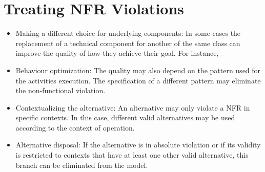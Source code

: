 \section{Treating NFR Violations}

\begin{itemize}

\item Making a different choice for underlying components: In some cases the replacement of a technical component for another of the same class can improve the quality of how they achieve their goal. For instance,
\medskip

\item Behaviour optimization: The quality may also depend on the pattern used for the activities execution. The specification of a different pattern may eliminate the non-functional violation. 
\medskip

\item Contextualizing the alternative: An alternative may only violate a NFR in specific contexts. In this case, different valid alternatives may be used according to the context of operation.
\medskip

\item Alternative disposal: If the alternative is in absolute violation or if its validity is restricted to contexts that have at least one other valid alternative, this branch can be eliminated from the model.

\end{itemize}







